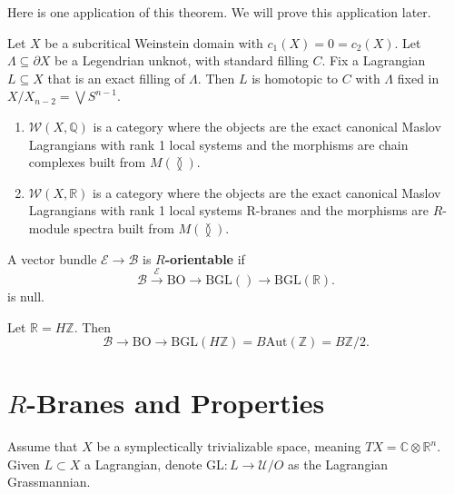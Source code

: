 Here is one application of this theorem. We will prove this application later.

\begin{theorem}

Let $X$ be a subcritical Weinstein domain with $c_1(X)=0=c_2(X)$. Let $\Lambda \subseteq \partial X$ be a Legendrian unknot, with standard filling $C$. Fix a Lagrangian $L\subseteq X$ that is an exact filling of $\Lambda$. Then $L$ is homotopic to $C$ with $\Lambda$ fixed in $X/X_{n-2} = \bigvee S^{n-1}$.

\end{theorem}

\begin{definition}
\text{ }
\begin{enumerate}
\item $\mathcal{W}(X, \mathbb{Q})$ is a category where the objects are the exact canonical Maslov Lagrangians with rank 1 local systems and the morphisms are chain complexes built from $M(\between)$.
\item $\mathcal{W}(X, \mathbb{R})$ is a category where the objects are the exact canonical Maslov Lagrangians with rank 1 local systems R-branes and the morphisms are $R$-module spectra built from $M(\between)$.
\end{enumerate}

\end{definition}

\begin{definition}

A vector bundle $\mathcal{E}\to \mathcal{B}$ is \textbf{$R$-orientable} if
\[
\mathcal{B}\stackrel{\mathcal{E}}{\longrightarrow} \text{BO} \longrightarrow \text{BGL}()\longrightarrow \text{BGL}(\mathbb{R}).
\]
is null.

\end{definition}

\begin{example}

Let $\mathbb{R}= H \mathbb{Z}$. Then
\[
\mathcal{B} \to \text{BO} \to \text{BGL}(H \mathbb{Z}) = B\text{Aut}(\mathbb{Z})=B\mathbb{Z}/2.
\]

\end{example}

\section{$R$-Branes and Properties}

Assume that $X$ be a symplectically trivializable space, meaning $TX=\mathbb{C}\otimes \mathbb{R}^n$. Given $L\subset X$ a Lagrangian, denote $\text{GL} : L\to \mathcal{U}/O$ as the Lagrangian Grassmannian.

